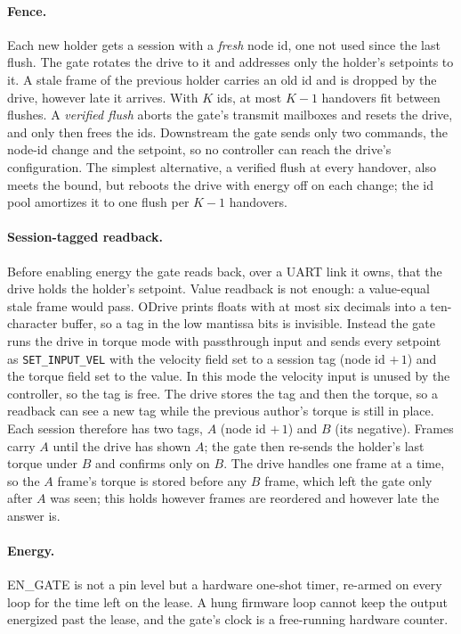 \documentclass[letterpaper]{article} %
\newcommand{\code}[1]{\texttt{#1}}
\begin{document}
\paragraph{Fence.} Each new holder gets a session with a \emph{fresh} node id, one not used
since the last flush. The gate rotates the drive to it and addresses only the holder's setpoints
to it. A stale frame of the previous holder carries an old id and is dropped by the drive, however
late it arrives. With $K$ ids, at most $K-1$ handovers fit between flushes. A \emph{verified
flush} aborts the gate's transmit mailboxes and resets the drive, and only then frees the ids.
Downstream the gate sends only two commands, the node-id change and the setpoint, so no
controller can reach the drive's configuration. The simplest alternative, a verified flush at
every handover, also meets the bound, but reboots the drive with energy off on each change; the
id pool amortizes it to one flush per $K-1$ handovers.

\paragraph{Session-tagged readback.} Before enabling energy the gate reads back, over a UART link
it owns, that the drive holds the holder's setpoint. Value readback is not enough: a value-equal
stale frame would pass. ODrive prints floats with at most six decimals into a ten-character
buffer, so a tag in the low mantissa bits is invisible. Instead the gate runs the drive in torque
mode with passthrough input and sends every setpoint as \code{SET\_INPUT\_VEL} with the velocity
field set to a session tag (node id $+\,1$) and the torque field set to the value. In this mode
the velocity input is unused by the controller, so the tag is free. The drive stores the tag and
then the torque, so a readback can see a new tag while the previous author's torque is still in
place. Each session therefore has two tags, $A$ (node id $+\,1$) and $B$ (its negative). Frames
carry $A$ until the drive has shown $A$; the gate then re-sends the holder's last torque under $B$
and confirms only on $B$. The drive handles one frame at a time, so the $A$ frame's torque is
stored before any $B$ frame, which left the gate only after $A$ was seen; this holds however
frames are reordered and however late the answer is.

\paragraph{Energy.} EN\_GATE is not a pin level but a hardware one-shot timer, re-armed on every
loop for the time left on the lease. A hung firmware loop cannot keep the output energized past
the lease, and the gate's clock is a free-running hardware counter.
\end{document}
